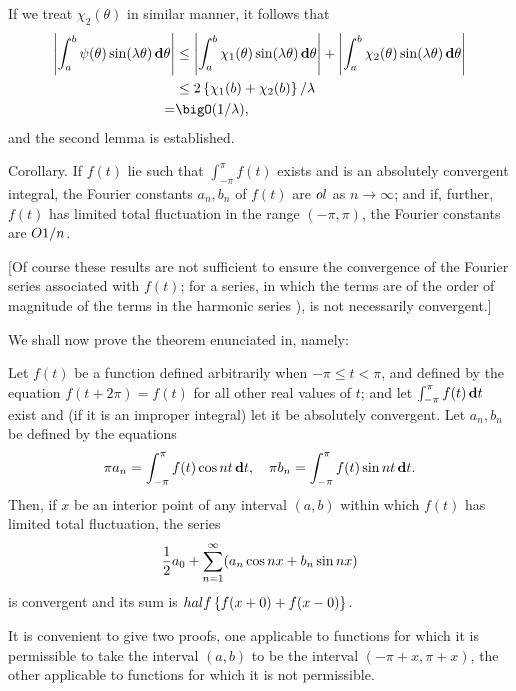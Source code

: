 If we treat $\chi_{2}(\theta)$ in similar manner, it follows that
\begin{align*}
  \absval{
    \int_{a}^{b} \psi (\theta) \sin(\lambda \theta) \dmeasure \theta
  }
  &
  \leq
  \absval{
    \int_{a}^{b} \chi_{1}(\theta) \sin(\lambda\theta) \dmeasure \theta
  }
  +
  \absval{
    \int_{a}^{b} \chi_{2}(\theta) \sin(\lambda\theta) \dmeasure \theta
  }
  \\
  &
  \leq
  2 \thebrace{ \chi_{1}(b) + \chi_{2}(b) } / \lambda
  \\
  = &
  \bigO(1 / \lambda),
\end{align*}
and the second lemma is established.

Corollary. If $f(t)$ lie such that $\int_{-\pi}^{\pi} f(t)$ %
exists and is an absolutely convergent integral,
the Fourier constants $a_{n}, b_{n}$ of $f(t)$ are $o{l}$ as
$n \rightarrow \infty$;
and if, further, $f(t)$ has limited total fluctuation in the range
$(-\pi, \pi)$, the Fourier constants are $O{1/n}$.

[Of course these results are not sufficient to ensure the convergence
of the Fourier series associated with $f(t)$; for a series, in which the
terms are of the order of magnitude of the terms in the harmonic
series ), is not necessarily convergent.]

%
%


We shall now prove the theorem enunciated in, namely:

Let $f(t)$ be a function defined arbitrarily when $-\pi \leq t < \pi$, and defined by the
equation $f(t + 2\pi) = f(t)$ for all other real values of $t$; and let
$\int_{-\pi}^{\pi} f(t) \, \mathbf{d} t$
exist and (if it is an improper integral) let it be absolutely
convergent. Let $a_{n}, b_{n}$ be defined by the equations
$$
\pi a_{n} = \int_{-\pi}^{\pi} f(t) \cos nt \, \mathbf{d} t,
\quad
\pi b_{n} = \int_{-\pi}^{\pi} f(t) \sin nt \, \mathbf{d} t.
$$
Then, if $x$ be an interior point of any interval $(a, b)$ within which
$f(t)$ has limited total fluctuation, the series
$$
\frac{1}{2} a_{0}
+
\sum_{n=1}^{\infty} (
a_{n} \cos nx + b_{n} \sin nx
)
$$
is convergent and its sum is $half \left\{ f(x+0) + f(x-0) \right\}$.

It is convenient to give two proofs, one applicable to functions for
which it is permissible to take the interval $(a, b)$ to be the interval
$(-\pi+x, \pi + x)$, the other applicable to functions for which it is
not permissible.

